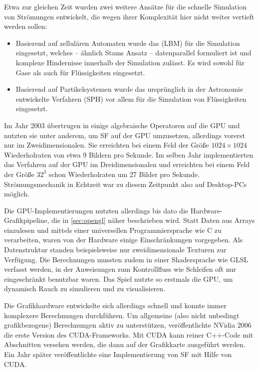 Etwa zur gleichen Zeit wurden zwei weitere Ansätze für die schnelle
Simulation von Strömungen entwickelt, die wegen ihrer Komplexität hier
nicht weiter vertieft werden sollen:
\begin{itemize}
\item Basierend auf zellulären Automaten wurde das
 (LBM) für die Simulation
eingesetzt, welches -- ähnlich Stams Ansatz -- datenparallel
formuliert ist und komplexe Hindernisse innerhalb der Simulation
zulässt. Es wird sowohl für Gase als auch für Flüssigkeiten
eingesetzt\cite{Chen1998}.
\item Basierend auf Partikelsystemen wurde das ursprünglich in der
Astronomie entwickelte Verfahren  (SPH) vor allem für die Simulation von Flüssigkeiten
eingesetzt\cite{Muller2003}.
\end{itemize}
Im Jahr 2003 übertrugen  in
\cite{Kruger2005} einige algebraische Operatoren auf die GPU und
nutzten sie unter anderem, um SF auf der GPU umzusetzen, allerdings
vorerst nur im Zweidimensionalen. Sie erreichten bei einem Feld der
Größe $1024 \times 1024$ Wiederholraten von etwa 9 Bildern pro
Sekunde. Im selben Jahr implementierten  das Verfahren
auf der GPU im Dreidimensionalen und erreichten bei einem Feld der
Größe $32^3$ schon Wiederholraten um 27 Bilder pro
Sekunde. Strömungsmechanik in Echtzeit war zu diesem Zeitpunkt also
auf Desktop-PCs möglich.

Die GPU-Implementierungen nutzten allerdings bis dato die
Hardware-Grafikpipeline, die in \autoref{sec:opengl} näher beschrieben
wird. Statt Daten aus Arrays einzulesen und mittels einer universellen
Programmiersprache wie C zu verarbeiten, waren von der Hardware einige
Einschränkungen vorgegeben. Als Datenstruktur standen beispielsweise
nur zweidimensionale Texturen zur Verfügung. Die Berechnungen mussten
zudem in einer Shadersprache wie GLSL verfasst werden, in der
Anweisungen zum Kontrollfluss wie \PimiddyzB Schleifen oft nur
eingeschränkt benutzbar waren. Das Spiel  nutzte so erstmals die GPU, um dynamisch Rauch zu simulieren
und zu visualisieren\cite{Crane2007}.

Die Grafikhardware entwickelte sich allerdings schnell und konnte
immer komplexere Berechnungen durchführen. Um allgemeine (also nicht
unbedingt grafikbezogene) Berechnungen aktiv zu unterstützen,
veröffentlichte NVidia 2006 die erste Version des CUDA-Frameworks. Mit
CUDA kann reiner C++-Code mit Abschnitten versehen werden, die dann
auf der Grafikkarte ausgeführt werden. Ein Jahr später veröffentlichte
 eine Implementierung von SF mit Hilfe von
CUDA\cite{Goodnight2007}.


